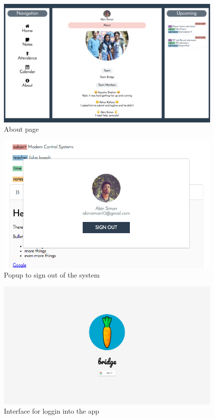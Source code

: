 \documentclass{article}
\begin{document}
\begin{figure}
  \includegraphics[width=\linewidth]{aboutpage.png}
  \caption{About page}
\end{figure}

\begin{figure}
  \includegraphics[width=\linewidth]{signoutpopup.png}
  \caption{Popup to sign out of the system}
\end{figure}

\begin{figure}
  \includegraphics[width=\linewidth]{loginpopup.png}
  \caption{Interface for loggin into the app}
\end{figure}
\end{document}
